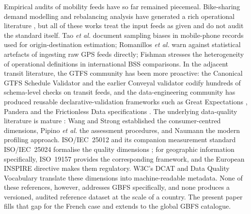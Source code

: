 \documentclass[11pt,a4paper]{article}
\begin{document}
Empirical audits of mobility feeds have so far remained piecemeal.
Bike-sharing demand modelling and rebalancing analysis have generated
a rich operational literature
\cite{Buehler2017BikeShare,Medard2017Rebalancing,Eren2020Review}, but
all of these works treat the input feeds as given and do not audit
the standard itself. Tao \textit{et al.} \cite{Tao2020} document
sampling biases in mobile-phone records used for origin-destination
estimation; Romanillos \textit{et al.} \cite{Romanillos2016} warn
against statistical artefacts of ingesting raw GPS feeds directly;
Fishman \cite{Fishman2016} stresses the heterogeneity of operational
definitions in international BSS comparisons.
In the adjacent transit literature, the GTFS community has been more
proactive: the Canonical GTFS Schedule Validator
\cite{MobilityData2024Validator} and the earlier Conveyal validator
\cite{Antrim2013Conveyal} codify hundreds of schema-level checks on
transit feeds, and the data-engineering community has produced reusable
declarative-validation frameworks such as Great Expectations
\cite{GreatExpectations2024}, Pandera \cite{Pandera2024} and the
Frictionless Data specifications \cite{FrictionlessData2023}.
The underlying data-quality literature is mature : Wang and Strong
\cite{Wang1996Quality} established the consumer-centred dimensions,
Pipino \textit{et al.} \cite{Pipino2002Assessment} the assessment
procedures, and Naumann \cite{Naumann2014DataProfiling} the modern
profiling approach. ISO/IEC~25012 \cite{ISO25012} and its companion
measurement standard ISO/IEC~25024 \cite{ISO25024} formalise the
quality dimensions ; for geographic information specifically,
ISO~19157 \cite{ISO19157} provides the corresponding framework, and
the European INSPIRE directive \cite{INSPIRE2007} makes them
regulatory. W3C's DCAT \cite{DCAT2020} and Data Quality Vocabulary
\cite{W3CDQV} translate these dimensions into machine-readable
metadata. None of these references, however, addresses GBFS
specifically, and none produces a versioned, audited reference
dataset at the scale of a country. The present paper fills that gap
for the French case and extends to the global GBFS catalogue.
\end{document}
